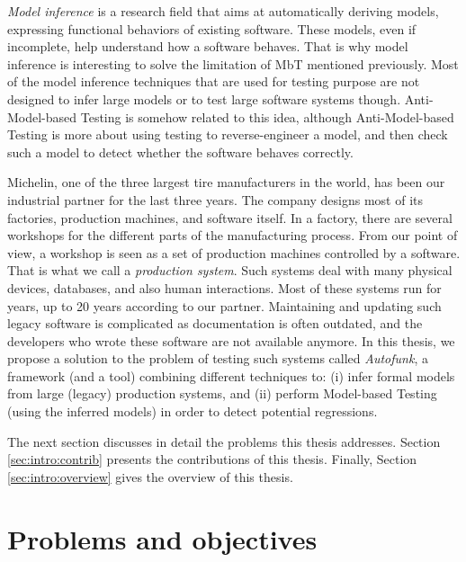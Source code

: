 \emph{Model inference} is a research field that aims at
automatically deriving models, expressing functional behaviors of
existing software. These models, even if incomplete, help
understand how a software behaves. That is why model inference is
interesting to solve the limitation of MbT mentioned previously.
Most of the model inference techniques that are used for testing
purpose are not designed to infer large models or to test large
software systems though. Anti-Model-based Testing \cite{antimbt} is
somehow related to this idea, although Anti-Model-based Testing
is more about using testing to reverse-engineer a model, and then
check such a model to detect whether the software behaves
correctly.

Michelin, one of the three largest tire manufacturers in the
world, has been our industrial partner for the last three years.
The company designs most of its factories, production machines,
and software itself. In a factory, there are several workshops
for the different parts of the manufacturing process. From our
point of view, a workshop is seen as a set of production machines
controlled by a software. That is what we call a \emph{production
system}. Such systems deal with many physical devices, databases,
and also human interactions. Most of these systems run for years,
up to 20 years according to our partner. Maintaining and updating
such legacy software is complicated as documentation is often
outdated, and the developers who wrote these software are not
available anymore.  In this thesis, we propose a solution to the
problem of testing such systems called \textit{Autofunk}, a
framework (and a tool) combining different techniques to: (i)
infer formal models from large (legacy) production systems, and
(ii) perform Model-based Testing (using the inferred models) in
order to detect potential regressions.

The next section discusses in detail the problems this thesis
addresses. Section \ref{sec:intro:contrib} presents the
contributions of this thesis. Finally, Section
\ref{sec:intro:overview} gives the overview of this thesis.


\section{Problems and objectives}
\label{sec:intro:problems}

